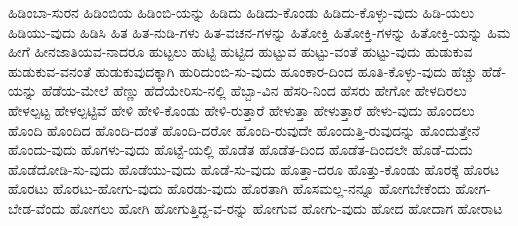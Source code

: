 {ಹಿಡಿಂಬಾ-ಸುರನ
ಹಿಡಿಂಬಿಯ
ಹಿಡಿಂಬಿ-ಯನ್ನು
ಹಿಡಿದು
ಹಿಡಿದು-ಕೊಂಡು
ಹಿಡಿದು-ಕೊಳ್ಳು-ವುದು
ಹಿಡಿ-ಯಲು
ಹಿಡಿಯು-ವುದು
ಹಿಡಿಸಿ
ಹಿತ
ಹಿತ-ನುಡಿ-ಗಳು
ಹಿತ-ವಚನ-ಗಳನ್ನು
ಹಿತೋಕ್ತಿ
ಹಿತೋಕ್ತಿ-ಗಳನ್ನು
ಹಿತೋಕ್ತಿ-ಯನ್ನು
ಹಿಮ
ಹೀಗೆ
ಹೀನಜಾತಿಯವ-ನಾದರೂ
ಹುಟ್ಟಲು
ಹುಟ್ಟಿ
ಹುಟ್ಟಿದ
ಹುಟ್ಟುವ
ಹುಟ್ಟು-ವಂತೆ
ಹುಟ್ಟು-ವುದು
ಹುಡುಕುವ
ಹುಡುಕುವ-ವನಂತೆ
ಹುಡುಕುವುದಕ್ಕಾಗಿ
ಹುರಿದುಂಬಿ-ಸು-ವುದು
ಹೂಂಕಾರ-ದಿಂದ
ಹೂತಿ-ಕೊಳ್ಳು-ವುದು
ಹೆಚ್ಚು
ಹೆಡೆ-ಯನ್ನು
ಹೆಡೆಯ-ಮೇಲೆ
ಹೆಣ್ಣು
ಹೆದೆಯೇರಿಸು-ನಲ್ಲಿ
ಹೆಬ್ಬಾ-ವಿನ
ಹೆಸರಿ-ನಿಂದ
ಹೆಸರು
ಹೇಗೋ
ಹೇಳದಿರಲು
ಹೇಳಲ್ಪಟ್ಟ
ಹೇಳಲ್ಪಟ್ಟಿವೆ
ಹೇಳಿ
ಹೇಳಿ-ಕೊಂಡು
ಹೇಳಿ-ರುತ್ತಾರೆ
ಹೇಳುತ್ತಾ
ಹೇಳುತ್ತಾರೆ
ಹೇಳು-ವುದು
ಹೊಂದಲು
ಹೊಂದಿ
ಹೊಂದಿದ
ಹೊಂದಿ-ದಂತೆ
ಹೊಂದಿ-ದರೋ
ಹೊಂದಿ-ರುವುದೇ
ಹೊಂದುತ್ತಿ-ರುವುದನ್ನು
ಹೊಂದುತ್ತೇನೆ
ಹೊಂದು-ವುದು
ಹೊಗಳು-ವುದು
ಹೊಟ್ಟೆ-ಯಲ್ಲಿ
ಹೊಡೆತ
ಹೊಡೆತ-ದಿಂದ
ಹೊಡೆತ-ದಿಂದಲೇ
ಹೊಡೆ-ದುದು
ಹೊಡೆದೋಡಿ-ಸು-ವುದು
ಹೊಡೆಯು-ವುದು
ಹೊಡೆ-ಸು-ವುದು
ಹೊತ್ತಾ-ದರೂ
ಹೊತ್ತು-ಕೊಂಡು
ಹೊರಕ್ಕೆ
ಹೊರಟ
ಹೊರಟು
ಹೊರಟು-ಹೋಗು-ವುದು
ಹೊರಡು-ವುದು
ಹೊರತಾಗಿ
ಹೊಸಮಲ್ಲ-ನನ್ನೂ
ಹೋಗಬೇಕೆಂದು
ಹೋಗ-ಬೇಡ-ವೆಂದು
ಹೋಗಲು
ಹೋಗಿ
ಹೋಗುತ್ತಿದ್ದ-ವ-ರನ್ನು
ಹೋಗುವ
ಹೋಗು-ವುದು
ಹೋದ
ಹೋದಾಗ
ಹೋರಾಟ
}

